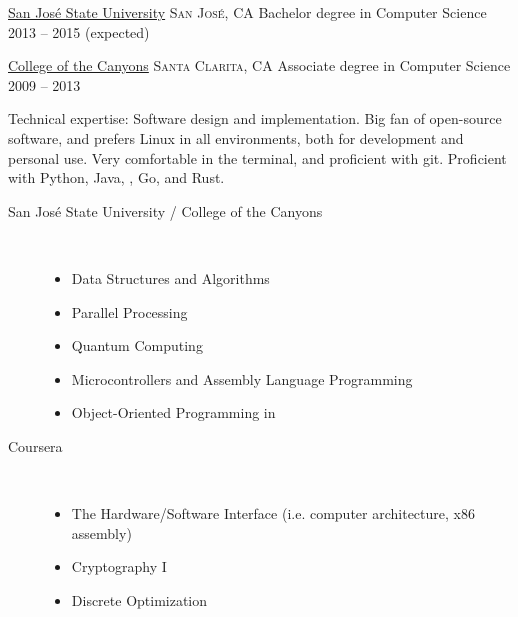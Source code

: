 \documentclass[10pt]{article}
\begin{document}
\spacedhrule{-0.2em}{-0.4em}


\headedsection
  {\href{http://www.sjsu.edu/}{San Jos\'{e} State University}}
  {\textsc{San Jos\'{e}, CA}} {%
  \headedsubsection
    {Bachelor degree in Computer Science}
    {2013 -- 2015 (expected)}
    {}
}

\headedsection
  {\href{http://www.canyons.edu/}{College of the Canyons}}
  {\textsc{Santa Clarita, CA}} {%
  \headedsubsection
    {Associate degree in Computer Science}
    {2009 -- 2013} {}
}

\spacedhrule{0.5em}{-0.4em}


\inlineheadsection  %
  {Technical expertise:}
  {Software design and implementation. Big fan of open-source software, and prefers Linux in all environments, both for development and personal use. Very comfortable in the terminal, and proficient with git. Proficient with Python, Java, \CPP, Go, and Rust.}

\pagebreak


\begin{multicols}{2}
	\begin{description}
		\item[\hspace{1em} San Jos\'{e} State University / College of the Canyons]{ \hfill \\[-1.5em]
		\begin{itemize}
			\item{Data Structures and Algorithms}
			\item{Parallel Processing}
			\item{Quantum Computing}
			\item{Microcontrollers and Assembly Language Programming}
			\item{Object-Oriented Programming in \CPP}
		\end{itemize}
		}
	\end{description}
	\begin{description}
		\item[\hspace{1em} Coursera]{ \hfill \\[-1.5em]
		\begin{itemize}
			\item{The Hardware/Software Interface (i.e. computer architecture, x86 assembly)}
			\item{Cryptography I}
			\item{Discrete Optimization}
		\end{itemize}
		}
	\end{description}
\end{multicols}
\end{document}
